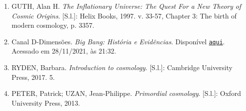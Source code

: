 \vspace{.5cm}

\artigoum 
\begin{enumerate}
    \item \label{ref1:artigo1} GUTH, Alan H. \textit{The Inflationary Universe: The Quest For a New Theory of Cosmic Origins}. [S.l.]: Helix Books, 1997. v. 33-57, Chapter 3: The birth of modern cosmology, p. 3357.
    \item \label{ref2:artigo1} Canal D-Dimensões. \textit{Big Bang: História e Evidências}. Disponível  \href{https://www.youtube.com/watch?v=ZaVhQJg5j0c&t}{{\tt aqui}}. Acessado em 28/11/2021, às 21:32.
    \item \label{ref3:artigo1} RYDEN, Barbara. \textit{Introduction to cosmology}. [S.l.]: Cambridge University Press, 2017. 5.
    \item \label{ref4:artigo1} PETER, Patrick; UZAN, Jean-Philippe. \textit{Primordial cosmology}. [S.l.]: Oxford University Press, 2013.
\end{enumerate}

